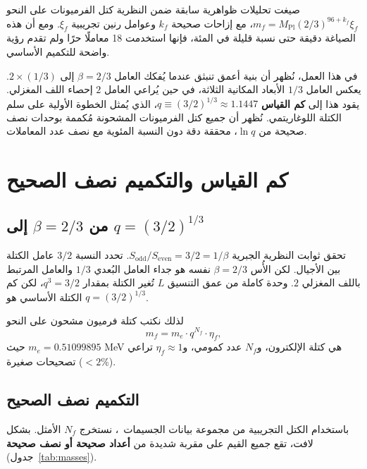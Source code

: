 \documentclass[12pt,a4paper]{article}
\begin{document}
	صيغت تحليلات ظواهرية سابقة ضمن النظرية كتل الفرميونات على النحو \(m_f = M_{\mathrm{Pl}}(2/3)^{96+k_f}\xi_f\)، مع إزاحات صحيحة \(k_f\) وعوامل رنين تجريبية \(\xi_f\). ومع أن هذه الصياغة دقيقة حتى نسبة قليلة في المئة، فإنها استخدمت 18 معاملًا حرًا ولم تقدم رؤية واضحة للتكميم الأساسي.
	
	في هذا العمل، نُظهر أن بنية أعمق تنبثق عندما يُفكك العامل \(\beta = 2/3\) إلى \(2 \times (1/3)\). يعكس العامل \(1/3\) الأبعاد المكانية الثلاثة، في حين يُراعي العامل \(2\) إحصاء اللف المغزلي. يقود هذا إلى \textbf{كم القياس} \(q \equiv (3/2)^{1/3} \approx 1.1447\)، الذي يُمثل الخطوة الأولية على سلم الكتلة اللوغاريتمي. نُظهر أن جميع كتل الفرميونات المشحونة مُكممة بوحدات نصف صحيحة من \(\ln q\)، محققة دقة دون النسبة المئوية مع نصف عدد المعاملات.
	
	\section{كم القياس والتكميم نصف الصحيح}
	
	\subsection{من \(\beta = 2/3\) إلى \(q = (3/2)^{1/3}\)}
	تحقق ثوابت النظرية الجبرية \(S_{\mathrm{odd}}/S_{\mathrm{even}} = 3/2 = 1/\beta\). تحدد النسبة \(3/2\) عامل الكتلة بين الأجيال. لكن الأُس \(\beta = 2/3\) نفسه هو جداء العامل البُعدي \(1/3\) والعامل المرتبط باللف المغزلي \(2\). وحدة كاملة من عمق التنسيق \(L\) تُغير الكتلة بمقدار \(q^3 = 3/2\)، لكن كم الكتلة الأساسي هو \(q = (3/2)^{1/3}\).
	
	لذلك نكتب كتلة فرميون مشحون على النحو
	\begin{equation}
		m_f = m_e \cdot q^{N_f} \cdot \eta_f,
		\label{eq:quantized}
	\end{equation}
	حيث \(m_e = 0.51099895\) MeV هي كتلة الإلكترون، و\(N_f\) عدد كمومي، و\(\eta_f \approx 1\) تراعي تصحيحات صغيرة (\(<2\%\)).
	
	\subsection{التكميم نصف الصحيح}
	باستخدام الكتل التجريبية من مجموعة بيانات الجسيمات~\cite{PDG2024}، نستخرج \(N_f\) الأمثل. بشكل لافت، تقع جميع القيم على مقربة شديدة من \textbf{أعداد صحيحة أو نصف صحيحة} (جدول~\ref{tab:masses}).
	
\end{document}
